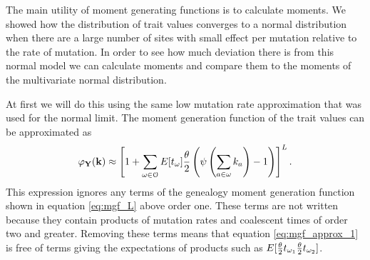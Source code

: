 The main utility of moment generating functions is to calculate moments. We
showed how the distribution of trait values converges to a normal distribution
when there are a large number of sites with small effect per mutation relative
to the rate of mutation. In order to see how much deviation there is from this
normal model we can calculate moments and compare them to the moments of the
multivariate normal distribution.

At first we will do this using the same low mutation rate approximation that was
used for the normal limit. The moment generation function of the trait values can 
be approximated as
\begin{equation}
  \label{eq:mgf_approx_1}
  \varphi_{\mathbf{Y}}(\mathbf{k}) \approx \left[ 1 + \sum_{\omega \in \mathcal{O}}
    E[t_\omega] \frac{\theta}{2} \left( \psi\left( \sum_{a \in \omega} k_a\right) -1 \right) \right]^L.
\end{equation}
This expression ignores any terms of the genealogy moment generation function
shown in equation \ref{eq:mgf_L} above order one. These terms are not written
because they contain products of mutation rates and coalescent times of order
two and greater. Removing these terms means that equation \ref{eq:mgf_approx_1}
is free of terms giving the expectations of products such as $E[\frac{\theta}{2} t_{\omega_1}
  \frac{\theta}{2} t_{\omega_2}]$.
